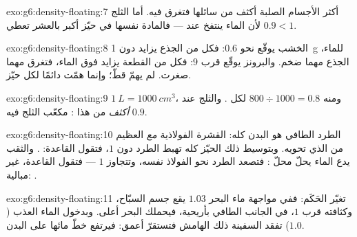 \begin{solution}{exo:g6:density-floating:7}
أكثر الأجسام الصلبة أكثف من سائلها فتغرق فيه. أما الثلج 
لأن الماء ينتفخ عند  --- فالمادة نفسها في حيّز أكبر
بالعشر تعطي  $0.9 < 1$.
\end{solution}

\begin{solution}{exo:g6:density-floating:8}
الخشب يوقّع نحو $0.6$: فكل  من الجذع يزايد دون
\qty{1}{g} للماء،  الجذع مهما ضخم. والبرونز يوقّع قرب
$9$: فكل  من القطعة يزايد فوق الماء، فتغرق مهما
صغرت.  لم يهمّ قطّ؛ وإنما همّت دائمًا  لكل حيّز.
\end{solution}

\begin{solution}{exo:g6:density-floating:9}
$\qty{1}{L} = \qty{1000}{cm^3}$، ومنه $800 \div 1000 = 0.8$ 
لكل . والثلج عند $0.9$ \emph{أكثف} من هذا :
 مكعّب الثلج فيه.
\end{solution}

\begin{solution}{exo:g6:density-floating:10}
الطرد الطافي هو البدن كله: القشرة الفولاذية \emph{مع} 
العظيم من  الذي تحويه. وبتوسيط ذلك الحيّز كله تهبط
 الطرد دون $1$، فتقول القاعدة: . والثقب يدع الماء
يحلّ محلّ : فتصعد  الطرد نحو  الفولاذ نفسه،
وتتجاوز $1$ --- فتقول القاعدة، غير مبالية: .
\end{solution}

\begin{solution}{exo:g6:density-floating:11}
تغيّر الحَكَم: ففي مواجهة  ماء البحر $1.03$ يقع جسم
السبّاح، وكثافته قرب $1$، في الجانب الطافي بأريحية، فيحملك
البحر أعلى. وبدخول الماء العذب ($1.0$) تفقد السفينة ذلك الهامش
فتستقرّ أعمق: فيرتفع خطّ مائها على البدن.
\end{solution}

